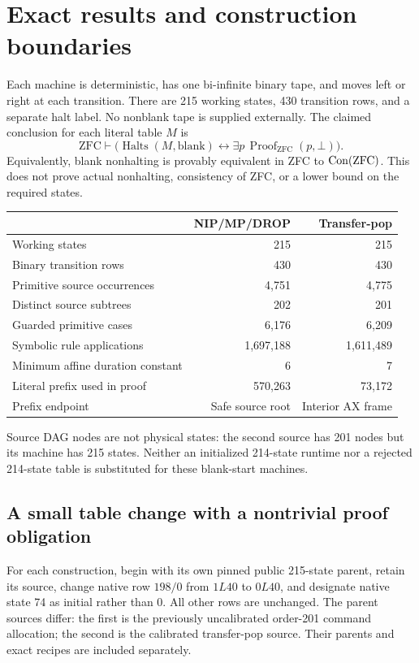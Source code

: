 \section{Exact results and construction boundaries}
Each machine is deterministic, has one bi-infinite binary tape, and moves left or right at each transition. There are 215 working states, 430 transition rows, and a separate halt label. No nonblank tape is supplied externally. The claimed conclusion for each literal table $M$ is
\[
\mathrm{ZFC}\vdash\bigl(\operatorname{Halts}(M,\mathrm{blank})
\leftrightarrow\exists p\,\operatorname{Proof}_{\mathrm{ZFC}}(p,\bot)\bigr).
\]
Equivalently, blank nonhalting is provably equivalent in ZFC to $\operatorname{Con}(\mathrm{ZFC})$. This does not prove actual nonhalting, consistency of ZFC, or a lower bound on the required states.

\begin{center}\small
\begin{tabular}{lrr}\toprule
& NIP/MP/DROP & Transfer-pop\\\midrule
Working states &215&215\\
Binary transition rows &430&430\\
Primitive source occurrences &4,751&4,775\\
Distinct source subtrees &202&201\\
Guarded primitive cases &6,176&6,209\\
Symbolic rule applications &1,697,188&1,611,489\\
Minimum affine duration constant &6&7\\
Literal prefix used in proof &570,263&73,172\\
Prefix endpoint &Safe source root&Interior AX frame\\\bottomrule
\end{tabular}
\end{center}
Source DAG nodes are not physical states: the second source has 201 nodes but its machine has 215 states. Neither an initialized 214-state runtime nor a rejected 214-state table is substituted for these blank-start machines.

\subsection{A small table change with a nontrivial proof obligation}
For each construction, begin with its own pinned public 215-state parent, retain its source, change native row $198/0$ from $1L40$ to $0L40$, and designate native state 74 as initial rather than 0. All other rows are unchanged. The parent sources differ: the first is the previously uncalibrated order-201 command allocation; the second is the calibrated transfer-pop source. Their parents and exact recipes are included separately.

